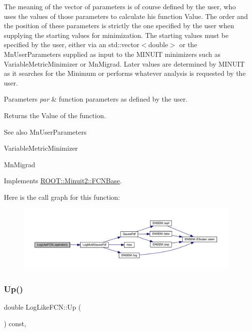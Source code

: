 The meaning of the vector of parameters is of course defined by the user, who uses the values of those parameters to calculate his function Value. The order and the position of these parameters is strictly the one specified by the user when supplying the starting values for minimization. The starting values must be specified by the user, either via an std\+::vector$<$double$>$ or the Mn\+User\+Parameters supplied as input to the M\+I\+N\+U\+IT minimizers such as Variable\+Metric\+Minimizer or Mn\+Migrad. Later values are determined by M\+I\+N\+U\+IT as it searches for the Minimum or performs whatever analysis is requested by the user.


\begin{DoxyParams}{Parameters}
{\em par} & function parameters as defined by the user.\\
\hline
\end{DoxyParams}
\begin{DoxyReturn}{Returns}
the Value of the function.
\end{DoxyReturn}
\begin{DoxySeeAlso}{See also}
Mn\+User\+Parameters 

Variable\+Metric\+Minimizer 

Mn\+Migrad 
\end{DoxySeeAlso}


Implements \mbox{\hyperlink{classROOT_1_1Minuit2_1_1FCNBase_ae4a86bd94d0d0f5ca6fc8f8ab2bb43cd}{R\+O\+O\+T\+::\+Minuit2\+::\+F\+C\+N\+Base}}.

Here is the call graph for this function\+:
\nopagebreak
\begin{figure}[H]
\begin{center}
\leavevmode
\includegraphics[width=350pt]{d2/d8c/structLogLikeFCN_a22d42d405147ecea23ab7b3a61003179_cgraph}
\end{center}
\end{figure}
\mbox{\label{structLogLikeFCN_ace81f647c3b49597fdfa5a9ff88e56d4}} 
\subsubsection{\texorpdfstring{Up()}{Up()}\hspace{0.1cm}{\footnotesize\ttfamily [1/2]}}
{\footnotesize\ttfamily double Log\+Like\+F\+C\+N\+::\+Up (\begin{DoxyParamCaption}{ }\end{DoxyParamCaption}) const\hspace{0.3cm}{\ttfamily [inline]}, {\ttfamily [virtual]}}

